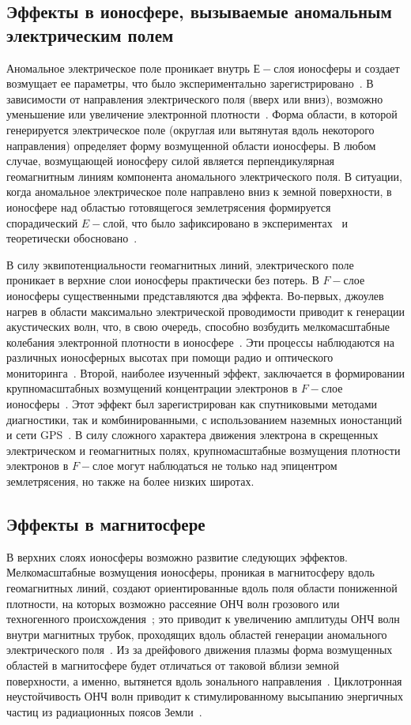 \documentclass[12pt, oneside, a4paper]{article}
\begin{document}
\subsection{Эффекты в ионосфере, вызываемые аномальным электрическим полем}
Аномальное электрическое поле проникает внутрь $Е-$слоя ионосферы и создает возмущает ее параметры, что было экспериментально зарегистрировано~\cite{Liperovsky:2000}. В зависимости от направления электрического поля (вверх или вниз), возможно уменьшение или увеличение электронной плотности~\cite{Pulinets:1998}. Форма области, в которой генерируется электрическое поле (округлая или вытянутая вдоль некоторого направления) определяет форму возмущенной области ионосферы. В любом случае,  возмущающей ионосферу силой является перпендикулярная геомагнитным линиям компонента аномального электрического поля. В ситуации, когда аномальное электрическое поле направлено вниз к земной поверхности, в ионосфере над областью готовящегося землетрясения формируется спорадический $E-$слой, что было зафиксировано в экспериментах~\cite{Ondoh_Hayakawa:1999} и теоретически обосновано~\cite{Kim:1994}.

В силу эквипотенциальности геомагнитных линий, электрического поле проникает в верхние слои ионосферы практически без потерь. В $F-$слое ионосферы существенными представляются два эффекта. Во-первых, джоулев нагрев в области максимально электрической проводимости  приводит к генерации акустических волн, что, в свою очередь, способно возбудить мелкомасштабные колебания электронной плотности в ионосфере~\cite{Hegai:1997}. Эти процессы наблюдаются на различных ионосферных высотах при помощи радио и оптического мониторинга~\cite{Chmyrev:1997}. Второй, наиболее изученный эффект, заключается в формировании крупномасштабных возмущений концентрации электронов в $F-$слое ионосферы~\cite{Pulinets_Legenka:2003}. Этот эффект был зарегистрирован как спутниковыми методами диагностики, так и комбинированными, с использованием наземных ионостанций и сети GPS~\cite{Lui:2004}. В силу сложного характера движения электрона в скрещенных электрическом и геомагнитных полях, крупномасштабные возмущения плотности электронов в $F-$слое могут наблюдаться  не только над  эпицентром землетрясения, но также на более низких широтах. 
\subsection{Эффекты в магнитосфере}
В верхних слоях ионосферы возможно развитие следующих эффектов. Мелкомасштабные возмущения ионосферы, проникая в магнитосферу вдоль геомагнитных линий, создают ориентированные вдоль поля области пониженной плотности, на которых возможно рассеяние ОНЧ волн грозового или техногенного происхождения~\cite{Kim_Hegai:1997}; это приводит к увеличению амплитуды ОНЧ волн внутри магнитных трубок, проходящих вдоль областей генерации аномального электрического поля~\cite{Shklyar_Nagano:1998}. Из за дрейфового движения плазмы форма возмущенных областей в магнитосфере будет отличаться от таковой вблизи земной поверхности, а именно, вытянется вдоль зонального направления~\cite{Kim_Hegai:1997}. Циклотронная неустойчивость ОНЧ волн приводит к стимулированному высыпанию  энергичных частиц из радиационных поясов Земли~\cite{Galper:1995}.
\end{document}

